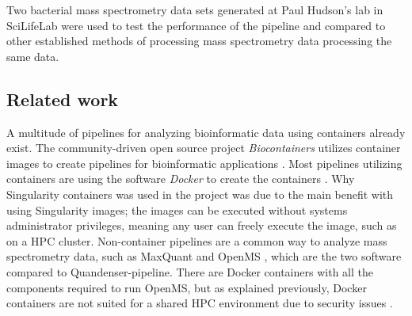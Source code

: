 Two bacterial mass spectrometry data sets generated at Paul Hudson's lab in SciLifeLab were used to test the performance of the pipeline and compared to other established methods of processing mass spectrometry data processing the same data.

\subsection{Related work}
A multitude of pipelines for analyzing bioinformatic data using containers already exist. The community-driven open source project \textit{Biocontainers} utilizes container images to create pipelines for bioinformatic applications \cite{biocontainers}. Most pipelines utilizing containers are using the software \textit{Docker} to create the containers \cite{docker}. Why Singularity containers was used in the project was due to the main benefit with using Singularity images; the images can be executed without systems administrator privileges, meaning any user can freely execute the image, such as on a HPC cluster. Non-container pipelines are a common way to analyze mass spectrometry data, such as MaxQuant and OpenMS \cite{maxquant} \cite{openms}, which are the two software compared to Quandenser-pipeline. There are Docker containers with all the components required to run OpenMS, but as explained previously, Docker containers are not suited for a shared HPC environment due to security issues \cite{openms-hpc}.


